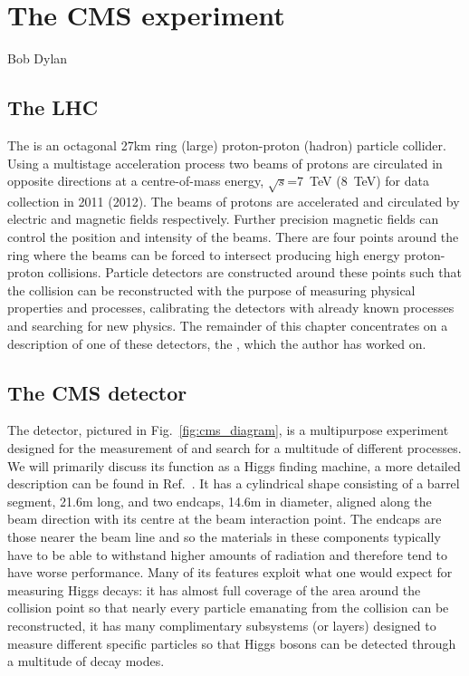 \chapter{The CMS experiment}
\label{chap:cms}
{Bob Dylan}

\section{The LHC}

The \LHC is an octagonal 27km ring (large) proton-proton (hadron) particle collider. Using a multistage acceleration process two beams of protons are circulated in opposite directions at a centre-of-mass energy, $\sqrt{s}$=7~TeV (8~TeV) for data collection in 2011 (2012). The beams of protons are accelerated and circulated by electric and magnetic fields respectively. Further precision magnetic fields can control the position and intensity of the beams. There are four points around the ring where the beams can be forced to intersect producing high energy proton-proton collisions. Particle detectors are constructed around these points such that the collision can be reconstructed with the purpose of measuring physical properties and processes, calibrating the detectors with already known processes and searching for new physics. The remainder of this chapter concentrates on a description of one of these detectors, the \CMS, which the author has worked on.

\section{The CMS detector}

The \CMS detector, pictured in Fig.~\ref{fig:cms_diagram}, is a multipurpose experiment designed for the measurement of and search for a multitude of different processes. We will primarily discuss its function as a Higgs finding machine, a more detailed description can be found in Ref.~\cite{CMS_JINST}. It has a cylindrical shape consisting of a barrel segment, 21.6m long, and two endcaps, 14.6m in diameter, aligned along the beam direction with its centre at the beam interaction point. The endcaps are those nearer the beam line and so the materials in these components typically have to be able to withstand higher amounts of radiation and therefore tend to have worse performance. Many of its features exploit what one would expect for measuring Higgs decays: it has almost full coverage of the area around the collision point so that nearly every particle emanating from the collision can be reconstructed, it has many complimentary subsystems (or layers) designed to measure different specific particles so that Higgs bosons can be detected through a multitude of decay modes. 

